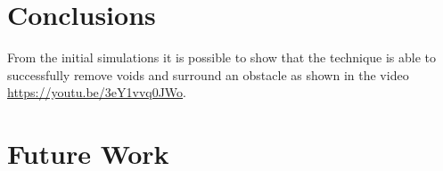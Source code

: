 \documentclass[12pt,a4paper]{IEEEtran}
\begin{document}
\section{Conclusions}\label{conclusions}
From the initial simulations it is possible to show that the technique is able to successfully remove voids and surround an obstacle as shown in the video \href{https://youtu.be/3eY1vvq0JWo}{https://youtu.be/3eY1vvq0JWo}.

\section{Future Work}



\end{document}
